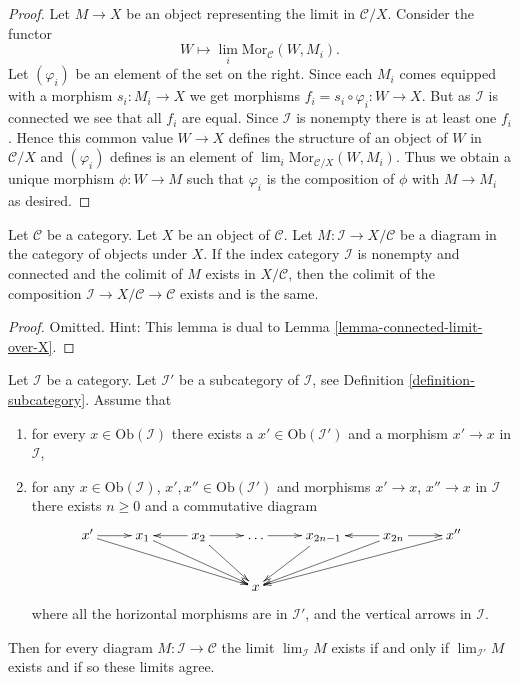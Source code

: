 \begin{proof}
Let $M \to X$ be an object representing the limit in $\mathcal{C}/X$.
Consider the functor
$$
W \longmapsto \lim_i \text{Mor}_{\mathcal{C}}(W, M_i).
$$
Let $(\varphi_i)$ be an element of the set on the right.
Since each $M_i$ comes equipped with a morphism $s_i : M_i \to X$ we
get morphisms $f_i = s_i \circ \varphi_i : W \to X$. But as $\mathcal{I}$
is connected we see that all $f_i$ are equal. Since $\mathcal{I}$
is nonempty there is at least one $f_i$.
Hence this common value $W \to X$ defines the structure of an
object of $W$ in $\mathcal{C}/X$ and $(\varphi_i)$ defines is an
element of $\lim_i \text{Mor}_{\mathcal{C}/X}(W, M_i)$.
Thus we obtain a unique morphism $\phi : W \to M$ such that
$\varphi_i$ is the composition of $\phi$ with $M \to M_i$ as desired.
\end{proof}

\begin{lemma}
\label{lemma-connected-colimit-under-X}
Let $\mathcal{C}$ be a category.
Let $X$ be an object of $\mathcal{C}$.
Let $M : \mathcal{I} \to X/\mathcal{C}$ be a diagram
in the category of objects under $X$.
If the index category $\mathcal{I}$ is nonempty and connected
and the colimit of $M$ exists in $X/\mathcal{C}$,
then the colimit of the composition
$\mathcal{I} \to X/\mathcal{C} \to \mathcal{C}$
exists and is the same.
\end{lemma}

\begin{proof}
Omitted. Hint: This lemma is dual to Lemma \ref{lemma-connected-limit-over-X}.
\end{proof}

\begin{lemma}
\label{lemma-limit-final-subcategory}
Let $\mathcal{I}$ be a category.
Let $\mathcal{I}'$ be a subcategory of $\mathcal{I}$, see
Definition \ref{definition-subcategory}.
Assume that
\begin{enumerate}
\item for every $x \in \text{Ob}(\mathcal{I})$
there exists a $x' \in \text{Ob}(\mathcal{I}')$ and
a morphism $x' \to x$ in $\mathcal{I}$,
\item for any $x \in \text{Ob}(\mathcal{I})$,
$x' , x'' \in \text{Ob}(\mathcal{I}')$
and morphisms $x' \to x$, $x'' \to x$ in $\mathcal{I}$
there exists $n \geq 0$ and a commutative diagram
$$
\xymatrix{
x' \ar[r] \ar[rrrd] & x_1 \ar[rrd] & x_2 \ar[rd] \ar[l] \ar[r] & \ldots \ar[r]
& x_{2n - 1} \ar[ld] & x_{2n} \ar[lld] \ar[l] \ar[r] & x'' \ar[llld] \\
& & & x & & &
}
$$
where all the horizontal morphisms are in $\mathcal{I}'$,
and the vertical arrows in $\mathcal{I}$.
\end{enumerate}
Then for every diagram $M : \mathcal{I} \to \mathcal{C}$
the limit $\lim_\mathcal{I} M$ exists if and only
if $\lim_{\mathcal{I}'} M$ exists and if so these limits
agree.
\end{lemma}

